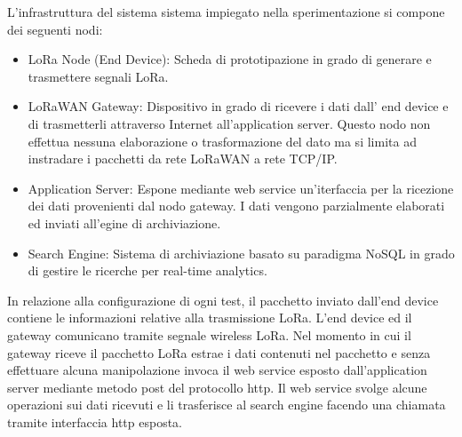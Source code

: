 \documentclass[12pt,a4paper,openright,twoside]{report}
\begin{document}
L'infrastruttura del sistema sistema impiegato nella sperimentazione si compone dei seguenti nodi:
\begin{itemize}                       
\item LoRa Node (End Device): Scheda di prototipazione in grado di generare e trasmettere segnali LoRa.   
\item LoRaWAN Gateway: Dispositivo in grado di ricevere i dati dall' end device e di trasmetterli attraverso Internet all'application server. Questo nodo non effettua nessuna elaborazione o trasformazione del dato ma si limita ad instradare i pacchetti da rete LoRaWAN a rete TCP/IP.  
\item Application Server: Espone mediante web service un'iterfaccia per la ricezione dei dati provenienti dal nodo gateway. I dati vengono parzialmente elaborati ed inviati all'egine di archiviazione.
\item Search Engine: Sistema di archiviazione basato su paradigma NoSQL in grado di gestire le ricerche per real-time analytics.  
\end{itemize}

In relazione alla configurazione di ogni test, il pacchetto inviato dall'end device contiene le informazioni relative alla trasmissione LoRa.
L'end device ed il gateway comunicano tramite segnale wireless LoRa. Nel momento in cui il gateway riceve il pacchetto LoRa estrae i dati contenuti nel pacchetto e senza effettuare alcuna manipolazione invoca il web service esposto dall'application server mediante metodo post del protocollo http. Il web service svolge alcune operazioni sui dati ricevuti e li trasferisce al search engine facendo una chiamata tramite interfaccia http esposta.    
\end{document}
